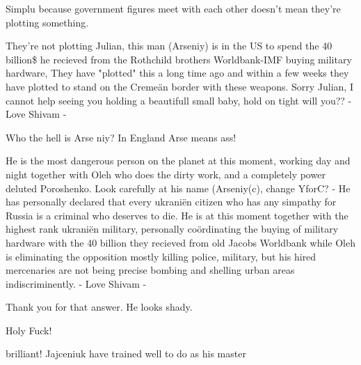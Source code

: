  
 
 
 
 


Simplu because government figures meet with each other doesn't mean they're
plotting something.

\begin{itemize} %

They're not plotting Julian, this man (Arseniy) is in the US to spend the 40
billion\$ he recieved from the Rothchild brothers Worldbank-IMF buying military
hardware, They have "plotted" this a long time ago and within a few weeks they
have plotted to stand on the Cremeän border with these weapons. Sorry Julian, I
cannot help seeing you holding a beautifull small baby, hold on tight will
you?? - Love Shivam -

\end{itemize} %


Who the hell is Arse niy? In England Arse means ass!

\begin{itemize} %

He is the most dangerous person on the planet at this moment, working day and
night together with Oleh who does the dirty work, and a completely power
deluted Poroshenko. Look carefully at his name (Arseniy(c), change YforC? - He
has personally declared that every ukraniën citizen who has any simpathy for
Russia is a criminal who deserves to die. He is at this moment together with
the highest rank ukraniën military, personally coördinating the buying of
military hardware with the 40 billion they recieved from old Jacobs Worldbank
while Oleh is eliminating the opposition mostly killing police, military, but
his hired mercenaries are not being precise bombing and shelling urban areas
indiscriminently. - Love Shivam -

Thank you for that answer. He looks shady.

Holy Fuck!
\end{itemize} %


brilliant! Jajceniuk have trained well to do as his master
